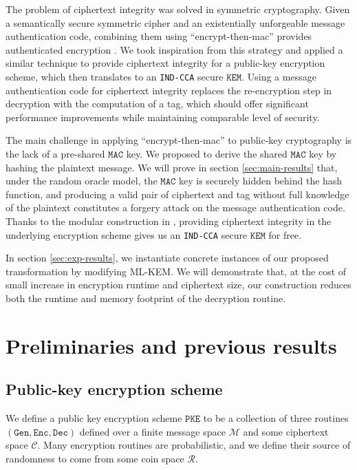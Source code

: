 \documentclass[floatrow,journal=tches,submission]{iacrtrans}
\newcommand{\monospace}{\texttt}
\newcommand{\pke}{\monospace{PKE}}
\newcommand{\keygen}{\monospace{Gen}}
\newcommand{\encrypt}{\monospace{Enc}}
\newcommand{\decrypt}{\monospace{Dec}}
\newcommand{\kem}{\monospace{KEM}}
\newcommand{\mac}{\monospace{MAC}}
\begin{document}
The problem of ciphertext integrity was solved in symmetric cryptography. Given a semantically secure symmetric cipher and an existentially unforgeable message authentication code, combining them using ``encrypt-then-mac'' provides authenticated encryption \cite{bellare2000authenticated}. We took inspiration from this strategy and applied a similar technique to provide ciphertext integrity for a public-key encryption scheme, which then translates to an \monospace{IND-CCA} secure $\kem$. Using a message authentication code for ciphertext integrity replaces the re-encryption step in decryption with the computation of a tag, which should offer significant performance improvements while maintaining comparable level of security.

The main challenge in applying ``encrypt-then-mac'' to public-key cryptography is the lack of a pre-shared $\mac$ key. We proposed to derive the shared $\mac$ key by hashing the plaintext message. We will prove in section \ref{sec:main-results} that, under the random oracle model, the $\mac$ key is securely hidden behind the hash function, and producing a valid pair of ciphertext and tag without full knowledge of the plaintext constitutes a forgery attack on the message authentication code. Thanks to the modular construction in \cite{hofheinz2017modular}, providing ciphertext integrity in the underlying encryption scheme gives us an \monospace{IND-CCA} secure $\kem$ for free.

In section \ref{sec:exp-results}, we instantiate concrete instances of our proposed transformation by modifying ML-KEM. We will demonstrate that, at the cost of small increase in encryption runtime and ciphertext size, our construction reduces both the runtime and memory footprint of the decryption routine. %

\section{Preliminaries and previous results}

\subsection{Public-key encryption scheme}
We define a public key encryption scheme $\pke$ to be a collection of three routines $(\keygen, \encrypt, \decrypt)$ defined over a finite message space $\mathcal{M}$ and some ciphertext space $\mathcal{C}$. Many encryption routines are probabilistic, and we define their source of randomness to come from some coin space $\mathcal{R}$.
\end{document}
